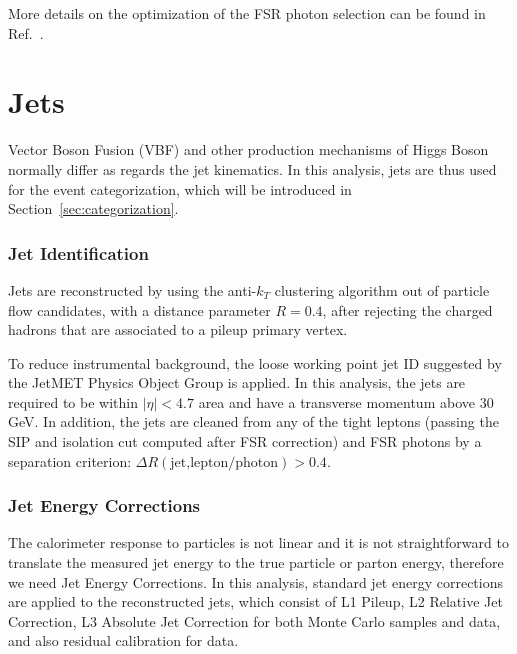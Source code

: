 More details on the optimization of the FSR photon selection can be found in Ref.~\cite{AN-15-277, AN-16-217}.

\section{Jets}
\label{sec:jets}

Vector Boson Fusion (VBF) and other production mechanisms of Higgs Boson normally differ as regards the jet kinematics. 
In this analysis, jets are thus used for the event categorization, which will be introduced in Section~\ref{sec:categorization}.

\subsubsection{Jet Identification}

Jets are reconstructed by using the anti-$k_T$ clustering algorithm out of particle flow candidates, with a distance parameter $R = 0.4$, 
after rejecting the charged hadrons that are associated to a pileup primary  vertex.

To reduce instrumental background, the loose working point jet ID suggested by the JetMET Physics Object Group is applied. 
In this analysis, the jets are required to be within $|\eta| < 4.7$ area and have a transverse momentum above 30 GeV. 
In addition, the jets are cleaned from any of the tight leptons (passing the SIP and isolation cut computed after FSR correction) 
and FSR photons by a separation criterion: $\Delta R(\text{jet,lepton/photon}) > 0.4$.


\subsubsection{Jet Energy Corrections}

The calorimeter response to particles is not linear
and it is not straightforward to translate the measured jet energy
to the true particle or parton energy, therefore we need Jet Energy Corrections.
In this analysis, standard jet energy corrections are applied to the reconstructed jets,
which consist of L1 Pileup, L2 Relative Jet Correction,
L3 Absolute Jet Correction for both Monte Carlo samples and data,
and also residual calibration for data.


